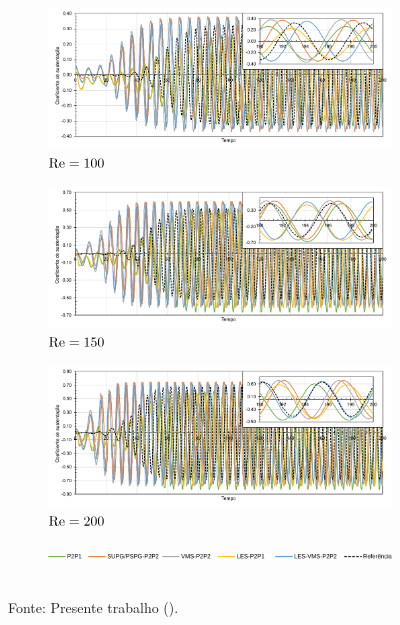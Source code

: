 \begin{figure}[h!]
    \centering
    \caption{Escoamento sobre cilindro - Coeficiente de sustentação ao longo do tempo para malha mais grosseira.}
    \begin{subfigure}{\textwidth}
        \includegraphics[width=\linewidth]{Figuras/cylinder/coarse/Cl100.pdf}
        \caption{$\mathrm{Re}=100$}
    \end{subfigure}
    \begin{subfigure}{\textwidth}
        \includegraphics[width=\linewidth]{Figuras/cylinder/coarse/Cl150.pdf}
        \caption{$\mathrm{Re}=150$}
    \end{subfigure}
    \begin{subfigure}{\textwidth}
        \includegraphics[width=\linewidth]{Figuras/cylinder/coarse/Cl200.pdf}
        \caption{$\mathrm{Re}=200$}
    \end{subfigure}
    \begin{subfigure}{.8\textwidth}
        \includegraphics[width=\linewidth]{Figuras/cylinder/legenda2.pdf}
    \end{subfigure}
    \\Fonte: Presente trabalho (\the\year).
    \label{fig:cyl-Cl2}
\end{figure}

